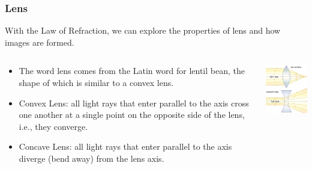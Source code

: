 \documentclass{beamer}
\begin{document}
\begin{frame}\frametitle{Lens}
With the Law of Refraction, we can explore the properties of lens and how images are formed.
\begin{columns}
\begin{column}{6.5cm}
\begin{itemize}
\item The word lens comes from the Latin word for lentil bean, the shape of which is similar to a convex lens.
\item Convex Lens: all light rays that enter parallel to the axis cross one another at  a single point on the opposite side of the lens, i.e., they converge.
\item Concave Lens: all light rays that enter parallel to the axis diverge (bend away) from the lens axis.
\end{itemize}
\end{column}
\begin{column}{4.5cm}
\begin{center}
\includegraphics[width=4cm]{fig/cavevex.jpg}
\end{center}
\end{column}
\end{columns}
\end{frame}
\end{document}
